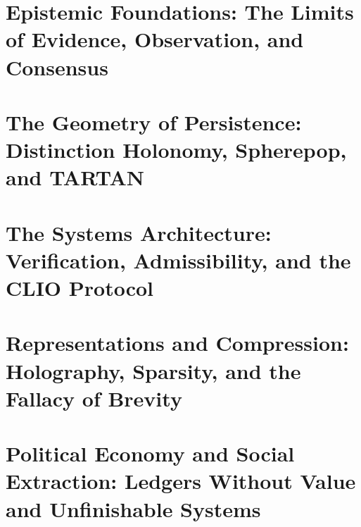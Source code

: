 \documentclass[11pt,twoside]{book}
\begin{document}
\frontmatter
\maketitle


\tableofcontents

\mainmatter

\part{Epistemic Foundations: The Limits of Evidence, Observation, and Consensus}





\part{The Geometry of Persistence: Distinction Holonomy, Spherepop, and TARTAN}






\part{The Systems Architecture: Verification, Admissibility, and the CLIO Protocol}






\part{Representations and Compression: Holography, Sparsity, and the Fallacy of Brevity}





\part{Political Economy and Social Extraction: Ledgers Without Value and Unfinishable Systems}





\backmatter
\appendix


\end{document}
